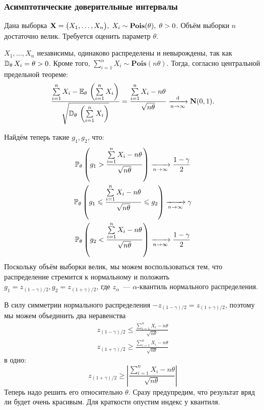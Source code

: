 \subsubsection{Асимптотические доверительные интервалы}
\begin{exmp}
    Дана выборка $\mathbf{X} = \bigl( X_1, \ldots, X_n \bigr), \; X_i \sim \mathbf{Pois}(\theta), \; \theta > 0$. 
    Объём выборки $n$ достаточно велик.
    Требуется оценить параметр $\theta$.

    $X_1, \ldots, X_n$ независимы, одинаково распределены и невырождены, так как ${\mathbb{D}_{\theta}\, X_i = \theta > 0}$.
    Кроме того, ${\sum\limits_{i = 1}^{n} X_i \sim \mathbf{Pois}(n\theta)}$.
    Тогда, согласно центральной предельной теореме:
    \begin{equation*}
        \frac{\sum\limits_{i=1}^{n} X_i - \mathbb{E}_{\theta}\, \left( \sum\limits_{i=1}^{n} X_i \right)}{\sqrt{\mathbb{D}_{\theta}\, \left( \sum\limits_{i=1}^{n} X_i \right)}} =
        \frac{\sum\limits_{i=1}^{n} X_i - n\theta}{\sqrt{n\theta}} 
        \xrightarrow[n \to \infty]{\text{d}} 
        \mathbf{N}(0, 1).
    \end{equation*}

    Найдём теперь такие $g_1, g_2$, что:
    \begin{gather*}
        \mathbb{P}_{\theta} \left(g_1 > \frac{\sum\limits_{i=1}^{n} X_i - n\theta}{\sqrt{n\theta}} \right) \xrightarrow[n \to \infty]{} \frac{1 - \gamma}{2} \\
        \mathbb{P}_{\theta} \left(g_1 \leqslant \frac{\sum\limits_{i=1}^{n} X_i - n\theta}{\sqrt{n\theta}} \leqslant g_2 \right) \xrightarrow[n \to \infty]{} \gamma \\
        \mathbb{P}_{\theta} \left(g_2 < \frac{\sum\limits_{i=1}^{n} X_i - n\theta}{\sqrt{n\theta}} \right) \xrightarrow[n \to \infty]{} \frac{1 - \gamma}{2}
    \end{gather*}
    Поскольку объём выборки велик, мы можем воспользоваться тем, что распределение стремится к нормальному и положить 
    $g_1 = z_{(1 - \gamma) / 2}, g_2 = z_{(1 + \gamma)/2}$, где $z_{\alpha}$~--- $\alpha$-квантиль нормального распределения.

    В силу симметрии нормального распределения $-z_{(1 - \gamma) / 2} = z_{(1 + \gamma)/2}$, поэтому мы можем объединить два неравенства
    \begin{gather*}
        z_{(1 - \gamma)/2} \leqslant \frac{\sum\limits_{i=1}^{n} X_i - n\theta}{\sqrt{n\theta}} \\
        z_{(1 + \gamma)/2} \geqslant \frac{\sum\limits_{i=1}^{n} X_i - n\theta}{\sqrt{n\theta}}
    \end{gather*}
    в одно:
    \begin{equation*}
        z_{(1 + \gamma)/2} \geqslant \left| \frac{\sum\limits_{i=1}^{n} X_i - n\theta}{\sqrt{n\theta}} \right|
    \end{equation*}
    Теперь надо решить его относительно $\theta$.    
    Сразу предупредим, что результат вряд ли будет очень красивым.
    Для краткости опустим индекс у квантиля.
    

\end{exmp}
